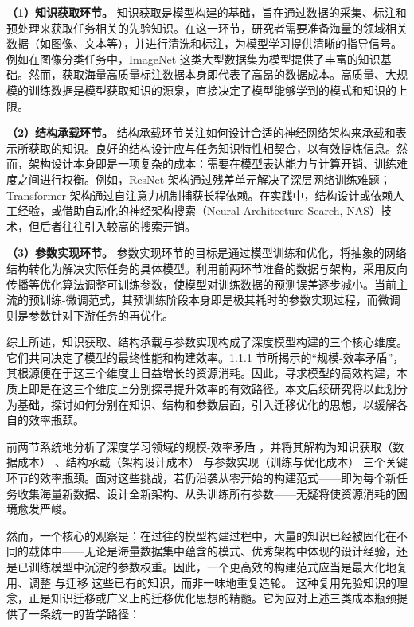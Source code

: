 \documentclass[../main.tex]{subfiles}
\begin{document}
\textbf{（1）知识获取环节。}
知识获取是模型构建的基础，旨在通过数据的采集、标注和预处理来获取任务相关的先验知识。在这一环节，研究者需要准备海量的领域相关数据（如图像、文本等），并进行清洗和标注，为模型学习提供清晰的指导信号。例如在图像分类任务中，ImageNet 这类大型数据集为模型提供了丰富的知识基础\cite{imagenetlargescale_deng_2009}。然而，获取海量高质量标注数据本身即代表了高昂的数据成本。高质量、大规模的训练数据是模型获取知识的源泉，直接决定了模型能够学到的模式和知识的上限。

\textbf{（2）结构承载环节。}
结构承载环节关注如何设计合适的神经网络架构来承载和表示所获取的知识。良好的结构设计应与任务知识特性相契合，以有效提炼信息。然而，架构设计本身即是一项复杂的成本：需要在模型表达能力与计算开销、训练难度之间进行权衡。例如，ResNet 架构通过残差单元解决了深层网络训练难题\cite{deepresiduallearning_he_2016}；Transformer 架构通过自注意力机制捕获长程依赖\cite{attentionisall_vaswani_2017}。在实践中，结构设计或依赖人工经验，或借助自动化的神经架构搜索（Neural Architecture Search, NAS）技术\cite{neuralarchitecturesearch_elsken_2019,neuralarchitecturesearch_zoph_2017,dartsdifferentiablearchitecture_liu_2019}，但后者往往引入较高的搜索开销。

\textbf{（3）参数实现环节。}
参数实现环节的目标是通过模型训练和优化，将抽象的网络结构转化为解决实际任务的具体模型。利用前两环节准备的数据与架构，采用反向传播等优化算法调整可训练参数\cite{learningrepresentationsback_rumelhart_1986}，使模型对训练数据的预测误差逐步减小。当前主流的预训练-微调范式\cite{bertpretraining_devlin_2019}，其预训练阶段本身即是极其耗时的参数实现过程，而微调则是参数针对下游任务的再优化。

综上所述，知识获取、结构承载与参数实现构成了深度模型构建的三个核心维度。它们共同决定了模型的最终性能和构建效率。1.1.1 节所揭示的“规模-效率矛盾”，其根源便在于这三个维度上日益增长的资源消耗。因此，寻求模型的高效构建，本质上即是在这三个维度上分别探寻提升效率的有效路径。本文后续研究将以此划分为基础，探讨如何分别在知识、结构和参数层面，引入迁移优化的思想，以缓解各自的效率瓶颈。


前两节系统地分析了深度学习领域的规模-效率矛盾 ，并将其解构为知识获取（数据成本） 、结构承载（架构设计成本） 与参数实现（训练与优化成本）  三个关键环节的效率瓶颈。面对这些挑战，若仍沿袭从零开始的构建范式——即为每个新任务收集海量新数据、设计全新架构、从头训练所有参数——无疑将使资源消耗的困境愈发严峻。

然而，一个核心的观察是：在过往的模型构建过程中，大量的知识已经被固化在不同的载体中——无论是海量数据集中蕴含的模式、优秀架构中体现的设计经验，还是已训练模型中沉淀的参数权重。因此，一个更高效的构建范式应当是最大化地复用、调整 与迁移 这些已有的知识，而非一味地重复造轮。
这种复用先验知识的理念，正是知识迁移或广义上的迁移优化思想的精髓\cite{surveytransferlearning_pan_2010}。它为应对上述三类成本瓶颈提供了一条统一的哲学路径：
\end{document}
